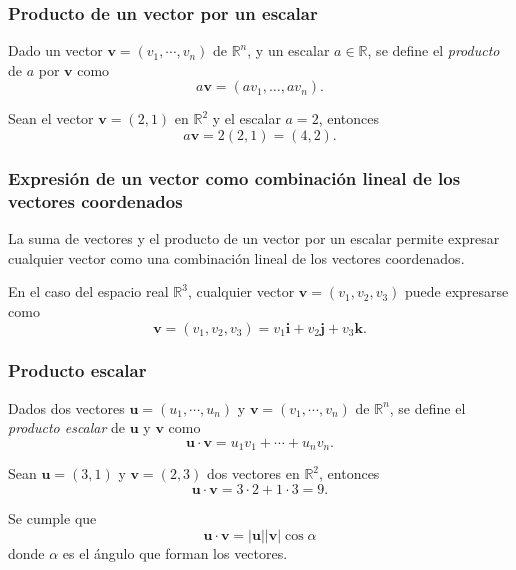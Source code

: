 \begin{frame}
\frametitle{Producto de un vector por un escalar}
\begin{definicion}
Dado un vector $\mathbf{v}=(v_1,\cdots,v_n)$ de $\mathbb{R}^n$, y un escalar $a\in \mathbb{R}$, se define el
\emph{producto} de $a$ por $\mathbf{v}$ como
\[
a\mathbf{v} = (av_1,\ldots, av_n).
\]
\end{definicion}
Sean el vector $\mathbf{v}=(2,1)$ en $\mathbb{R}^2$ y el escalar $a=2$, entonces
\[
a\mathbf{v} = 2(2,1) = (4,2).
\]

\begin{center}
\scalebox{0.8}{}
\end{center}
\end{frame}  


\begin{frame}
\frametitle{Expresión de un vector como combinación lineal de los vectores coordenados}
La suma de vectores y el producto de un vector por un escalar permite expresar cualquier vector como una combinación lineal de los vectores coordenados.

En el caso del espacio real $\mathbb{R}^3$, cualquier vector $\mathbf{v}=(v_1,v_2,v_3)$ puede expresarse como   
\[
\mathbf{v}=(v_1,v_2,v_3) = v_1\mathbf{i}+v_2\mathbf{j}+v_3\mathbf{k}.
\]

\begin{center}
\scalebox{0.8}{}
\end{center}
\end{frame} 


\begin{frame}
\frametitle{Producto escalar}
\begin{definicion}
Dados dos vectores $\mathbf{u}=(u_1,\cdots,u_n)$ y $\mathbf{v}=(v_1,\cdots,v_n)$ de $\mathbb{R}^n$, se define el
\emph{producto escalar} de $\mathbf{u}$ y $\mathbf{v}$ como
\[
\mathbf{u}\cdot \mathbf{v} = u_1v_1 + \cdots + u_nv_n.
\]
\end{definicion}
Sean $\mathbf{u}=(3,1)$ y $\mathbf{v}=(2,3)$ dos vectores en $\mathbb{R}^2$, entonces
\[
\mathbf{u}\cdot\mathbf{v} = 3\cdot 2 +1\cdot 3 = 9.
\]

Se cumple que
\[
\mathbf{u}\cdot\mathbf{v} =  |\mathbf{u}||\mathbf{v}|\cos\alpha
\]
donde $\alpha$ es el ángulo que forman los vectores.
\end{frame} 



